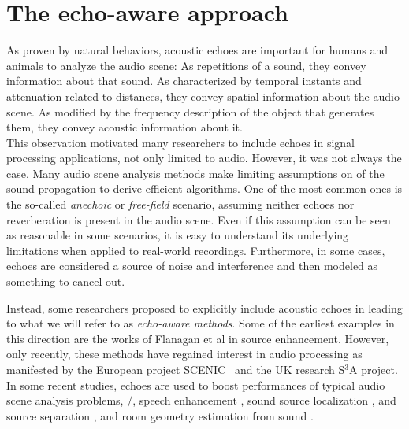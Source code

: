 \section{The echo-aware approach}
As proven by natural behaviors, acoustic echoes are important for humans and animals to analyze the audio scene:
As repetitions of a sound, they convey information about that sound.
As characterized by temporal instants and attenuation related to distances, they convey spatial information about the audio scene.
As modified by the frequency description of the object that generates them, they convey acoustic information about it.
\\This observation motivated many researchers to include echoes in signal processing applications, not only limited to audio.
However, it was not always the case.
Many audio scene analysis methods make limiting assumptions on of the sound propagation to derive efficient algorithms.
One of the most common ones is the so-called \textit{anechoic} or \textit{free-field} scenario, assuming neither echoes nor reverberation is present in the audio scene.
Even if this assumption can be seen as reasonable in some scenarios, it is easy to understand its underlying limitations when applied to real-world recordings.
Furthermore, in some cases, echoes are considered a source of noise and interference and then modeled as something to cancel out.

\mynewline
Instead, some researchers proposed to explicitly include acoustic echoes in leading to what we will refer to as \textit{echo-aware methods}.
Some of the earliest examples in this direction are the works of Flanagan et al in source enhancement.
However, only recently, these methods have regained interest in audio processing as manifested by the European project SCENIC~ and the UK research \href{http://www.s3a-spatialaudio.org/}{S$^3$A project}.
In some recent studies, echoes are used to boost performances of typical audio scene analysis problems, \eg/, speech enhancement , sound source localization , and source separation , and room geometry estimation from sound .

